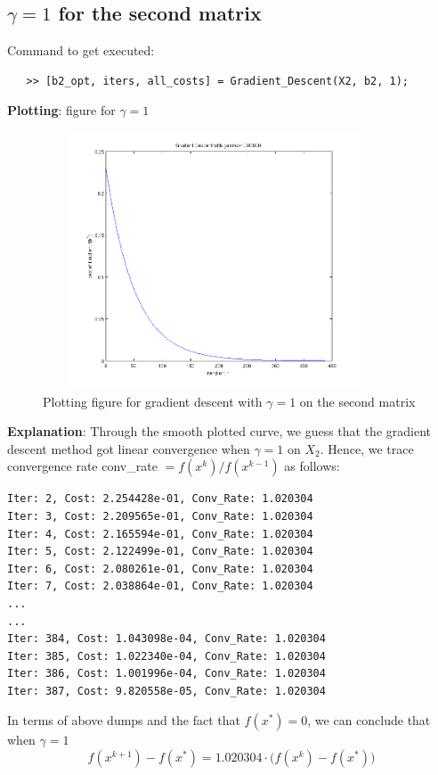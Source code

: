 \documentclass[11pt,a4paper]{article}
\begin{document}
\subsection{$\gamma = 1$ for the second matrix}
Command to get executed: 
\begin{verbatim}
   >> [b2_opt, iters, all_costs] = Gradient_Descent(X2, b2, 1);
\end{verbatim}
{\bf Plotting}: figure for $\gamma = 1$
\begin{figure}[h]
            \centering
            \includegraphics[width=4in,height=3in]{../ps1_matlab/2_gamma1.png}
            \caption{Plotting figure for gradient descent with $\gamma = 1$ on
            the second matrix}
\end{figure}

\noindent
{\bf Explanation}: 
Through the smooth plotted curve, we guess that the gradient
descent method got linear convergence when $\gamma=1$ on $X_2$. Hence, we trace
convergence rate conv\_rate $ = f(x^{k}) / f(x^{k-1})$ as follows:
\begin{verbatim}
Iter: 2, Cost: 2.254428e-01, Conv_Rate: 1.020304
Iter: 3, Cost: 2.209565e-01, Conv_Rate: 1.020304
Iter: 4, Cost: 2.165594e-01, Conv_Rate: 1.020304
Iter: 5, Cost: 2.122499e-01, Conv_Rate: 1.020304
Iter: 6, Cost: 2.080261e-01, Conv_Rate: 1.020304
Iter: 7, Cost: 2.038864e-01, Conv_Rate: 1.020304
...
...
Iter: 384, Cost: 1.043098e-04, Conv_Rate: 1.020304
Iter: 385, Cost: 1.022340e-04, Conv_Rate: 1.020304
Iter: 386, Cost: 1.001996e-04, Conv_Rate: 1.020304
Iter: 387, Cost: 9.820558e-05, Conv_Rate: 1.020304
\end{verbatim}
In terms of above dumps and the fact that $f(x^{*}) = 0$, we can conclude that when $\gamma = 1$        
$$
f(x^{k+1}) - f(x^{*}) = 1.020304 \cdot \big( f(x^{k}) - f(x^{*}) \big)
$$
\end{document}

